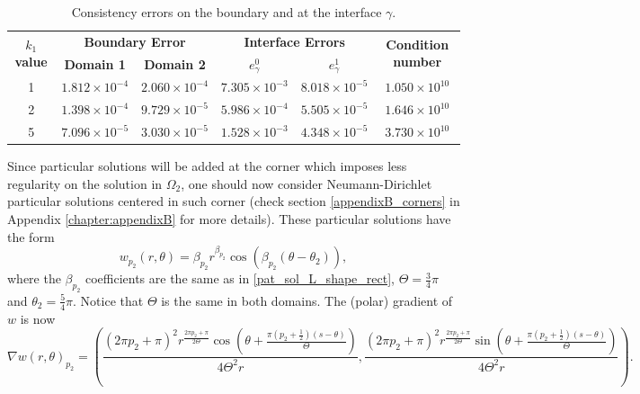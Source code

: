\begin{table}[!htbp]
    \centering
    \begin{tabular}{cccccc}
      \toprule
      \multirow{2}{*}{\textbf{\(k_1\) value}} & \multicolumn{2}{c}{\textbf{Boundary Error}} & \multicolumn{2}{c}{\textbf{Interface Errors}} & \multirow{2}{*}{\textbf{Condition number}} \\
      \cmidrule(lr){2-3} \cmidrule(lr){4-5}
      & \textbf{Domain 1} & \textbf{Domain 2} & \textbf{\(e_\gamma^0\)} & \textbf{\(e_\gamma^1\)} & \\
      \midrule
      1 & $1.812\times10^{-4}$ & $2.060\times10^{-4}$ & $7.305\times10^{-3}$ & $8.018\times10^{-5}$ & $1.050\times 10^{10}$ \\
      2 & $1.398\times10^{-4}$ & $9.729\times10^{-5}$ & $5.986\times10^{-4}$ & $5.505\times10^{-5}$ & $1.646\times 10^{10}$ \\
      5 & $7.096\times10^{-5}$ & $3.030\times10^{-5}$ & $1.528\times10^{-3}$ & $4.348\times10^{-5}$ & $3.730\times 10^{10}$ \\
      \bottomrule
    \end{tabular}
    \caption{Consistency errors on the boundary and at the interface \(\gamma\).}
    \label{tab:transmission_results_L_shape_axis}
\end{table}

Since particular solutions will be added at the corner which imposes less regularity on the solution in \(\Omega_2\), one should now consider Neumann-Dirichlet particular solutions centered in such corner (check section \ref{appendixB_corners} in Appendix \ref{chapter:appendixB} for more details). These particular solutions have the form
\[
    w_{p_2}(r,\theta) = \beta_{p_2} r^{\beta_{p_2}}\cos(\beta_{p_2}(\theta-\theta_2)),
\]
where the \(\beta_{p_2}\) coefficients are the same as in \eqref{pat_sol_L_shape_rect}, \(\Theta = \frac{3}{4}\pi\) and \(\theta_2=\frac{5}{4}\pi\). Notice that \(\Theta\) is the same in both domains. The (polar) gradient of \(w\) is now
\begin{equation*}
    \nabla w(r,\theta)_{p_2} = \left(\frac{(2 \pi  {p_2}+\pi )^2 r^{\frac{2 \pi  {p_2}+\pi }{2 \Theta }} \cos \left(\theta +\frac{\pi  \left({p_2}+\frac{1}{2}\right) (s-\theta )}{\Theta }\right)}{4 \Theta ^2 r},\frac{(2 \pi  {p_2}+\pi )^2 r^{\frac{2 \pi  {p_2}+\pi }{2 \Theta }} \sin \left(\theta +\frac{\pi  \left({p_2}+\frac{1}{2}\right) (s-\theta )}{\Theta }\right)}{4 \Theta ^2 r}\right).
\end{equation*}


